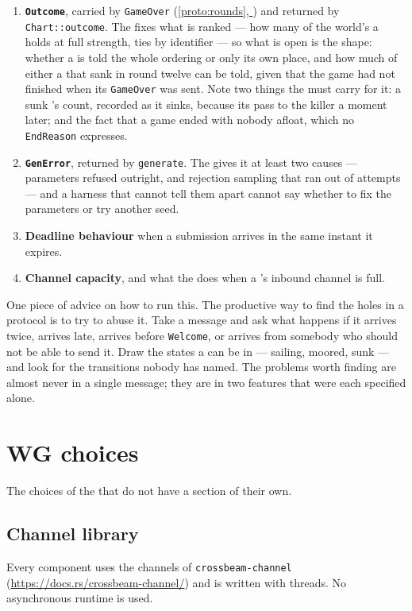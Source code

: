 \documentclass{article}
\newcommand{\fullref}[1]{\hyperref[#1]{\cref*{#1}, \nameref*{#1}}}
\begin{document}
\begin{enumerate}
      a \clue, a refusal, and ``not yet, come back in $n$ rounds''. A \clue{} it returns is always
      of the same variant as the one it was given.
    \item \textbf{\texttt{Outcome}}, carried by \texttt{GameOver} (\fullref{proto:rounds}) and
      returned by \texttt{Chart::outcome}. The \MD{} fixes what is ranked --- how many of the
      world's \clues{} a \ship{} holds at full strength, ties by identifier --- so what is open is
      the shape: whether a \ship{} is told the whole ordering or only its own place, and how much
      of either a \ship{} that sank in round twelve can be told, given that the game had not
      finished when its \texttt{GameOver} was sent. Note two things the \chart{} must carry for
      it: a sunk \ship's count, recorded as it sinks, because its \clues{} pass to the killer a
      moment later; and the fact that a game ended with nobody afloat, which no \texttt{EndReason}
      expresses.
    \item \textbf{\texttt{GenError}}, returned by \texttt{generate}. The \MD{} gives it at least
      two causes --- parameters refused outright, and rejection sampling that ran out of attempts
      --- and a harness that cannot tell them apart cannot say whether to fix the parameters or
      try another seed.
    \item \textbf{Deadline behaviour} when a submission arrives in the same instant it expires.
    \item \textbf{Channel capacity}, and what the \admiralty{} does when a \ship's inbound channel
      is full.
\end{enumerate}

One piece of advice on how to run this. The productive way to find the holes in a protocol is to
try to abuse it. Take a message and ask what happens if it arrives twice, arrives late, arrives
before \texttt{Welcome}, or arrives from somebody who should not be able to send it. Draw the
states a \ship{} can be in --- sailing, moored, sunk --- and look for the transitions nobody has
named. The problems worth finding are almost never in a single message; they are in two features
that were each specified alone.

\newpage
\section{WG choices}
\label{proto:wgchoices}

The choices of the \WG{} that do not have a section of their own.

\subsection{Channel library}
\label{proto:channels}

Every component uses the channels of \texttt{crossbeam-channel}
(\url{https://docs.rs/crossbeam-channel/}) and is written with threads. No asynchronous runtime
is used.
\end{document}
